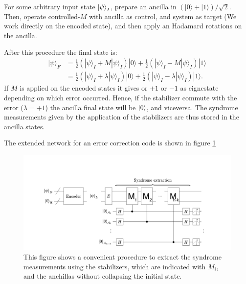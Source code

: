 For some arbitrary input state $\ket{\psi}_I$, prepare an ancilla in $(|0\rangle+|1\rangle) / \sqrt{2}$. 
Then, operate controlled-$M$ with ancilla as control, and system as target (We work directly on the encoded state), and then apply an Hadamard rotations on the ancilla. 

After this procedure the final state is: 
\begin{align*}
|\psi\rangle_{F}&=\frac{1}{2}\left(|\psi\rangle_{I}+M|\psi\rangle_{I}\right)|0\rangle+\frac{1}{2}\left(|\psi\rangle_{I}-M|\psi\rangle_{I}\right)|1\rangle \\
&=\frac{1}{2}\left(|\psi\rangle_{I}+\lambda|\psi\rangle_{I}\right)|0\rangle+\frac{1}{2}\left(|\psi\rangle_{I}-\lambda|\psi\rangle_{I}\right)|1\rangle.
\end{align*}
If $M$ is applied on the encoded states it gives or $+1$ or $-1$ as eignestate depending on which error occurred. %
Hence, if the stabilizer commute with the error ($\lambda=+1$) the ancilla final state will be $\ket{0}$, and viceversa. The syndrome measurements given by the application of the stabilizers are thus stored in the ancilla states. 


The extended network for an error correction code is shown in figure \ref{fig:stab_extract}
\begin{figure}[h!]
    \centering
     \includegraphics[width=\textwidth]{Mainmatter/images/General_stab_Code.png}
     \caption{This figure shows a convenient procedure to extract the syndrome measurements using the stabilizers, which are indicated with $M_i$, and the anchillas without collapsing the initial state. }
     \label{fig:stab_extract}
\end{figure}



